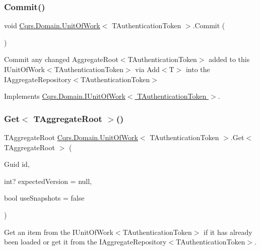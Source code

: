 \subsubsection{\texorpdfstring{Commit()}{Commit()}}
{\footnotesize\ttfamily void \hyperlink{classCqrs_1_1Domain_1_1UnitOfWork}{Cqrs.\+Domain.\+Unit\+Of\+Work}$<$ T\+Authentication\+Token $>$.Commit (\begin{DoxyParamCaption}{ }\end{DoxyParamCaption})}



Commit any changed Aggregate\+Root$<$\+T\+Authentication\+Token$>$ added to this I\+Unit\+Of\+Work$<$\+T\+Authentication\+Token$>$ via Add$<$\+T$>$ into the I\+Aggregate\+Repository$<$\+T\+Authentication\+Token$>$ 



Implements \hyperlink{interfaceCqrs_1_1Domain_1_1IUnitOfWork_ade600c9bf9e8380c24eaf1e7e0df6e01_ade600c9bf9e8380c24eaf1e7e0df6e01}{Cqrs.\+Domain.\+I\+Unit\+Of\+Work$<$ T\+Authentication\+Token $>$}.

\mbox{\label{classCqrs_1_1Domain_1_1UnitOfWork_a0592865d52ba0eafb9a5ad1fbdad9729_a0592865d52ba0eafb9a5ad1fbdad9729}} 
\subsubsection{\texorpdfstring{Get$<$ T\+Aggregate\+Root $>$()}{Get< TAggregateRoot >()}}
{\footnotesize\ttfamily T\+Aggregate\+Root \hyperlink{classCqrs_1_1Domain_1_1UnitOfWork}{Cqrs.\+Domain.\+Unit\+Of\+Work}$<$ T\+Authentication\+Token $>$.Get$<$ T\+Aggregate\+Root $>$ (\begin{DoxyParamCaption}\item[{Guid}]{id,  }\item[{int?}]{expected\+Version = {\ttfamily null},  }\item[{bool}]{use\+Snapshots = {\ttfamily false} }\end{DoxyParamCaption})}



Get an item from the I\+Unit\+Of\+Work$<$\+T\+Authentication\+Token$>$ if it has already been loaded or get it from the I\+Aggregate\+Repository$<$\+T\+Authentication\+Token$>$. 



